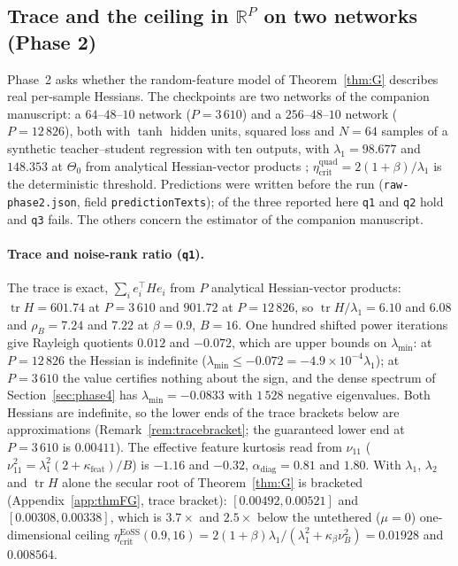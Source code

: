 \documentclass[11pt]{article}
\theoremstyle{remark}
\newcommand{\etacrit}{\eta_{\mathrm{crit}}}
\newcommand{\R}{\mathbb{R}}
\newcommand{\tr}{\operatorname{tr}}
\begin{document}
\subsection{Trace and the ceiling in \texorpdfstring{$\R^P$}{R\^P} on two networks (Phase 2)}\label{sec:phase2}

Phase~2 asks whether the random-feature model of Theorem~\ref{thm:G} describes real per-sample Hessians. The checkpoints are two networks of the companion manuscript: a $64\text{--}48\text{--}10$ network ($P=3\,610$) and a $256\text{--}48\text{--}10$ network ($P=12\,826$), both with $\tanh$ hidden units, squared loss and $N=64$ samples of a synthetic teacher--student regression with ten outputs, with $\lambda_1=98.677$ and $148.353$ at $\Theta_0$ from analytical Hessian-vector products \citep{pearlmutter1994}; $\etacrit^{\mathrm{quad}}=2(1+\beta)/\lambda_1$ is the deterministic threshold. Predictions were written before the run (\texttt{raw-phase2.json}, field \texttt{predictionTexts}); of the three reported here \texttt{q1} and \texttt{q2} hold and \texttt{q3} fails. The others concern the estimator of the companion manuscript.

\paragraph{Trace and noise-rank ratio (\texttt{q1}).} The trace is exact, $\sum_ie_i^\top He_i$ from $P$ analytical Hessian-vector products: $\tr H=601.74$ at $P=3\,610$ and $901.72$ at $P=12\,826$, so $\tr H/\lambda_1=6.10$ and $6.08$ and $\rho_B=7.24$ and $7.22$ at $\beta=0.9$, $B=16$. One hundred shifted power iterations give Rayleigh quotients $0.012$ and $-0.072$, which are upper bounds on $\lambda_{\min}$: at $P=12\,826$ the Hessian is indefinite ($\lambda_{\min}\le-0.072=-4.9\times10^{-4}\lambda_1$); at $P=3\,610$ the value certifies nothing about the sign, and the dense spectrum of Section~\ref{sec:phase4} has $\lambda_{\min}=-0.0833$ with $1\,528$ negative eigenvalues. Both Hessians are indefinite, so the lower ends of the trace brackets below are approximations (Remark~\ref{rem:tracebracket}; the guaranteed lower end at $P=3\,610$ is $0.00411$). The effective feature kurtosis read from $\nu_{11}$ ($\nu_{11}^2=\lambda_1^2(2+\kappa_{\mathrm{feat}})/B$) is $-1.16$ and $-0.32$, $\alpha_{\mathrm{diag}}=0.81$ and $1.80$. With $\lambda_1$, $\lambda_2$ and $\tr H$ alone the secular root of Theorem~\ref{thm:G} is bracketed (Appendix~\ref{app:thmFG}, trace bracket): $[0.00492,0.00521]$ and $[0.00308,0.00338]$, which is $3.7\times$ and $2.5\times$ below the untethered ($\mu=0$) one-dimensional ceiling $\etacrit^{\mathrm{EoSS}}(0.9,16)=2(1+\beta)\lambda_1/(\lambda_1^2+\kappa_\beta\nu_B^2)=0.01928$ and $0.008564$.
\end{document}

